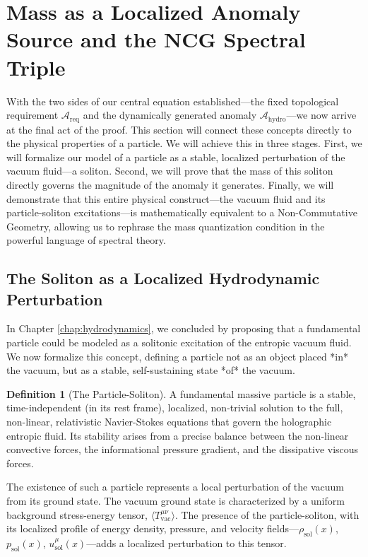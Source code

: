 \documentclass[11pt, letterpaper]{report}
\theoremstyle{plain} %
\theoremstyle{definition} %
\newtheorem{definition}{Definition}[chapter]
\theoremstyle{remark} %
\begin{document}
\section{Mass as a Localized Anomaly Source and the NCG Spectral Triple}
\label{sec:mass_as_anomaly_source}

With the two sides of our central equation established—the fixed topological requirement $\mathcal{A}_{\text{req}}$ and the dynamically generated anomaly $\mathcal{A}_{\text{hydro}}$—we now arrive at the final act of the proof. This section will connect these concepts directly to the physical properties of a particle. We will achieve this in three stages. First, we will formalize our model of a particle as a stable, localized perturbation of the vacuum fluid—a soliton. Second, we will prove that the mass of this soliton directly governs the magnitude of the anomaly it generates. Finally, we will demonstrate that this entire physical construct—the vacuum fluid and its particle-soliton excitations—is mathematically equivalent to a Non-Commutative Geometry, allowing us to rephrase the mass quantization condition in the powerful language of spectral theory.

\subsection{The Soliton as a Localized Hydrodynamic Perturbation}
\label{subsec:soliton_perturbation}

In Chapter \ref{chap:hydrodynamics}, we concluded by proposing that a fundamental particle could be modeled as a solitonic excitation of the entropic vacuum fluid. We now formalize this concept, defining a particle not as an object placed *in* the vacuum, but as a stable, self-sustaining state *of* the vacuum.

\begin{definition}[The Particle-Soliton]
A fundamental massive particle is a stable, time-independent (in its rest frame), localized, non-trivial solution to the full, non-linear, relativistic Navier-Stokes equations that govern the holographic entropic fluid. Its stability arises from a precise balance between the non-linear convective forces, the informational pressure gradient, and the dissipative viscous forces.
\end{definition}

The existence of such a particle represents a local perturbation of the vacuum from its ground state. The vacuum ground state is characterized by a uniform background stress-energy tensor, $\langle T^{\mu\nu}_{\text{vac}} \rangle$. The presence of the particle-soliton, with its localized profile of energy density, pressure, and velocity fields—$\rho_{\text{sol}}(x)$, $p_{\text{sol}}(x)$, $u^\mu_{\text{sol}}(x)$—adds a localized perturbation to this tensor.
\end{document}

